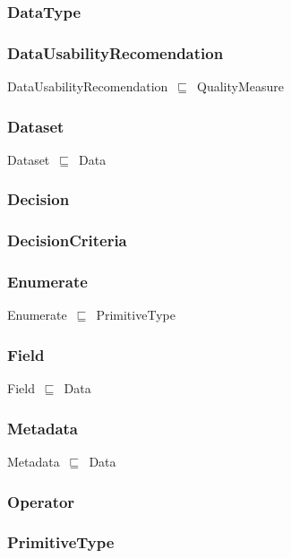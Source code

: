 \documentclass{article}
\begin{document}
\subsubsection*{DataType}

\subsubsection*{DataUsabilityRecomendation}

DataUsabilityRecomendation~\ensuremath{\sqsubseteq}~QualityMeasure~

\subsubsection*{Dataset}

Dataset~\ensuremath{\sqsubseteq}~Data~

\subsubsection*{Decision}

\subsubsection*{DecisionCriteria}

\subsubsection*{Enumerate}

Enumerate~\ensuremath{\sqsubseteq}~PrimitiveType~

\subsubsection*{Field}

Field~\ensuremath{\sqsubseteq}~Data~

\subsubsection*{Metadata}

Metadata~\ensuremath{\sqsubseteq}~Data~

\subsubsection*{Operator}

\subsubsection*{PrimitiveType}
\end{document}
